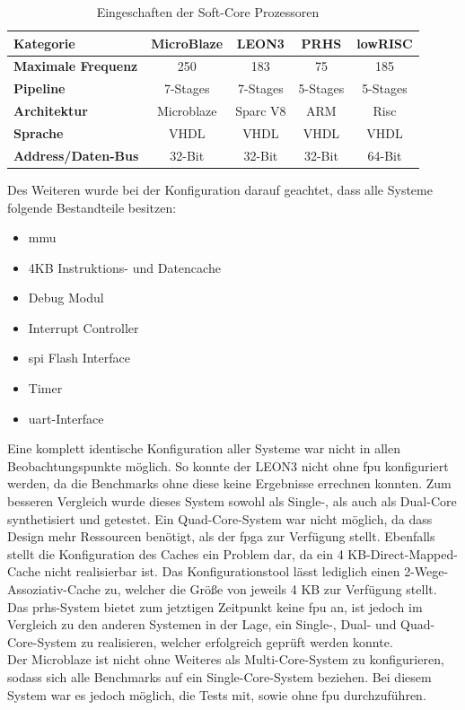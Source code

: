 \begin{table}[H]
\centering
\begin{tabular}{|l|c|c|c|c|}
  \hline
  \textbf{Kategorie} & \textbf{MicroBlaze} & \textbf{LEON3}& \textbf{PRHS}& \textbf{lowRISC}\\
  \hline
  \textbf{Maximale Frequenz} &250 & 183 & 75 & 185\\
  \hline
  \textbf{Pipeline} & 7-Stages & 7-Stages & 5-Stages & 5-Stages\\
  \hline
  \textbf{Architektur} & Microblaze & Sparc V8  & ARM &  Risc\\
  \hline
  \textbf{Sprache} & VHDL & VHDL & VHDL & VHDL\\
    \hline
  \textbf{Address/Daten-Bus} & 32-Bit & 32-Bit & 32-Bit & 64-Bit\\
      \hline
\end{tabular}
  \caption{Eingeschaften der Soft-Core Prozessoren ~\cite{comparison}}
 \label{tab:features}
  \end{table}

Des Weiteren wurde bei der Konfiguration darauf geachtet, dass alle Systeme folgende Bestandteile besitzen:\\
\begin{itemize}
  \item \ac{mmu}
  \item 4KB Instruktions- und Datencache
  \item Debug Modul
  \item Interrupt Controller
  \item \ac{spi} Flash Interface
  \item Timer
  \item \ac{uart}-Interface
\end{itemize}

Eine komplett identische Konfiguration aller Systeme war nicht in allen Beobachtungspunkte möglich. So konnte der LEON3 nicht ohne \ac{fpu} konfiguriert werden, da die Benchmarks ohne diese
keine Ergebnisse errechnen konnten. Zum besseren Vergleich wurde dieses System sowohl als Single-, als auch als Dual-Core synthetisiert und getestet. Ein Quad-Core-System war nicht möglich,
da dass Design mehr Ressourcen benötigt, als der \ac{fpga} zur Verfügung stellt. Ebenfalls stellt die Konfiguration
des Caches ein Problem dar, da ein 4 KB-Direct-Mapped-Cache nicht realisierbar ist. Das Konfigurationstool lässt lediglich einen 2-Wege-Assoziativ-Cache zu, welcher die Größe von jeweils 4 KB
zur Verfügung stellt.\\
Das \ac{prhs}-System bietet zum jetztigen Zeitpunkt keine \ac{fpu} an, ist jedoch im Vergleich zu den anderen Systemen in der Lage, ein Single-, Dual- und Quad-Core-System zu realisieren,
 welcher erfolgreich geprüft werden konnte.\\
 Der Microblaze ist nicht ohne Weiteres als Multi-Core-System zu konfigurieren, sodass sich alle Benchmarks auf ein Single-Core-System beziehen. Bei diesem System war es jedoch möglich,
 die Tests mit, sowie ohne \ac{fpu} durchzuführen.\\




